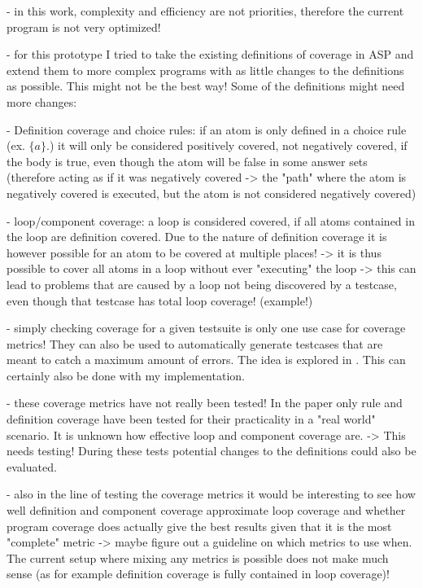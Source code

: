 - in this work, complexity and efficiency are not priorities, therefore the current program is not very optimized!

- for this prototype I tried to take the existing definitions of coverage in ASP and extend them to more complex programs with as little 
changes to the definitions as possible. This might not be the best way! Some of the definitions might need more changes:

    - Definition coverage and choice rules: if an atom is only defined in a choice rule (ex. $\{a\}.$) it will only be considered positively 
    covered, not negatively covered, if the body is true, even though the atom will be false in some answer sets (therefore acting as if 
    it was negatively covered -> the "path" where the atom is negatively covered is executed, but the atom is not considered negatively covered)

    - loop/component coverage: a loop is considered covered, if all atoms contained in the loop are definition covered. Due to the nature 
    of definition coverage it is however possible for an atom to be covered at multiple places! -> it is thus possible to cover all 
    atoms in a loop without ever "executing" the loop -> this can lead to problems that are caused by a loop not being discovered by 
    a testcase, even though that testcase has total loop coverage! (example!)

- simply checking coverage for a given testsuite is only one use case for coverage metrics! They can also be used to automatically generate 
testcases that are meant to catch a maximum amount of errors. The idea is explored in \cite{Jan+11}. This can certainly also be done with 
my implementation.

- these coverage metrics have not really been tested! In the paper \cite{Jan+11} only rule and definition coverage have been tested for 
their practicality in a "real world" scenario. It is unknown how effective loop and component coverage are. -> This needs testing! 
During these tests potential changes to the definitions could also be evaluated.

- also in the line of testing the coverage metrics it would be interesting to see how well definition and component coverage approximate 
loop coverage and whether program coverage does actually give the best results given that it is the most "complete" metric
-> maybe figure out a guideline on which metrics to use when. The current setup where mixing any metrics is possible does not make much 
sense (as for example definition coverage is fully contained in loop coverage)!


